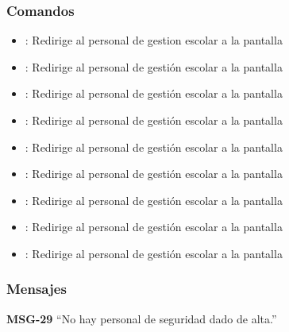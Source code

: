 \subsubsection{Comandos}
\begin{itemize}
    \item {}: Redirige al personal de gestion escolar a la pantalla 
    
    \item {}: Redirige al personal de gestión escolar a la pantalla 
    \item {}: Redirige al personal de gestión escolar a la pantalla 
    
    \item {}: Redirige al personal de gestión escolar a la pantalla 
    \item {}: Redirige al personal de gestión escolar a la pantalla 
    
    \item {}: Redirige al personal de gestión escolar a la pantalla 
    \item {}: Redirige al personal de gestión escolar a la pantalla 
    
    \item {}: Redirige al personal de gestión escolar a la pantalla 
    \item {}: Redirige al personal de gestión escolar a la pantalla     
\end{itemize}

\subsubsection{Mensajes}

\begin{Citemize}
    \item {\bf MSG-29}  ``No hay personal de seguridad dado de alta.''
\end{Citemize}



